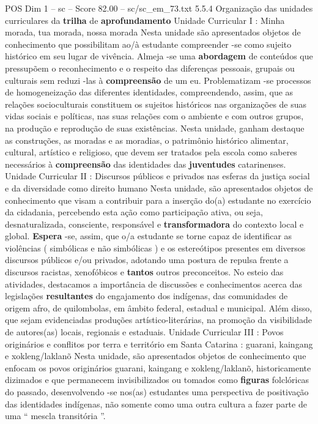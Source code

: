 \begin{textsample}{POS Dim 1 – sc – Score 82.00 – sc/sc\_em\_73.txt}  \label{ex:f1_pos_004}
5.5.4 Organização das unidades curriculares da \textbf{trilha} de \textbf{aprofundamento} Unidade Curricular I : Minha morada, tua morada, nossa morada Nesta unidade são apresentados objetos de conhecimento que possibilitam ao/à estudante compreender -se como sujeito histórico em seu lugar de vivência.
Almeja -se uma \textbf{abordagem} de conteúdos que pressupõem o reconhecimento e o respeito das diferenças pessoais, grupais ou culturais sem reduzi -las à \textbf{compreensão} de um eu.
Problematizam -se processos de homogeneização das diferentes identidades, compreendendo, assim, que as relações socioculturais constituem os sujeitos históricos nas organizações de suas vidas sociais e políticas, nas suas relações com o ambiente e com outros grupos, na produção e reprodução de suas existências.
Nesta unidade, ganham destaque as construções, as moradas e as moradias, o patrimônio histórico alimentar, cultural, artístico e religioso, que devem ser tratados pela escola como saberes necessários à \textbf{compreensão} das identidades das \textbf{juventudes} catarinenses.
Unidade Curricular II : Discursos públicos e privados nas esferas da justiça social e da diversidade como direito humano Nesta unidade, são apresentados objetos de conhecimento que visam a contribuir para a inserção do(a) estudante no exercício da cidadania, percebendo esta ação como participação ativa, ou seja, desnaturalizada, consciente, responsável e \textbf{transformadora} do contexto local e global. \textbf{Espera} -se, assim, que o/a estudante se torne capaz de identificar as violências ( simbólicas e não simbólicas ) e os estereótipos presentes em diversos discursos públicos e/ou privados, adotando uma postura de repulsa frente a discursos racistas, xenofóbicos e \textbf{tantos} outros preconceitos.
No esteio das atividades, destacamos a importância de discussões e conhecimentos acerca das legislações \textbf{resultantes} do engajamento dos indígenas, das comunidades de origem afro, de quilombolas, em âmbito federal, estadual e municipal.
Além disso, que sejam evidenciadas produções artístico-literárias, na promoção da visibilidade de autores(as) locais, regionais e estaduais.
Unidade Curricular III : Povos originários e conflitos por terra e território em Santa Catarina : guarani, kaingang e xokleng/laklanõ Nesta unidade, são apresentados objetos de conhecimento que enfocam os povos originários guarani, kaingang e xokleng/laklanõ, historicamente dizimados e que permanecem invisibilizados ou tomados como \textbf{figuras} folclóricas do passado, desenvolvendo -se nos(as) estudantes uma perspectiva de positivação das identidades indígenas, não somente como uma outra cultura a fazer parte de uma “ mescla transitória ”.

\end{textsample}
